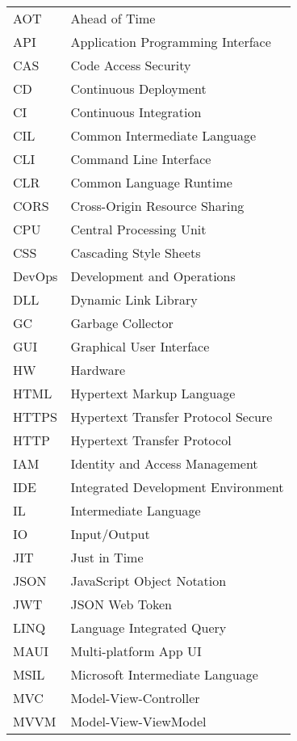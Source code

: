 
\seznamzkr

\begin{tabular}{ll}
AOT & Ahead of Time \\
API & Application Programming Interface \\
CAS & Code Access Security \\
CD & Continuous Deployment \\
CI & Continuous Integration \\
CIL & Common Intermediate Language \\
CLI & Command Line Interface \\
CLR & Common Language Runtime \\
CORS & Cross-Origin Resource Sharing \\
CPU & Central Processing Unit \\
CSS & Cascading Style Sheets \\
DevOps & Development and Operations \\
DLL & Dynamic Link Library \\
GC & Garbage Collector \\
GUI & Graphical User Interface \\
HW & Hardware \\
HTML & Hypertext Markup Language \\
HTTPS & Hypertext Transfer Protocol Secure \\
HTTP & Hypertext Transfer Protocol \\
IAM & Identity and Access Management \\
IDE & Integrated Development Environment \\
IL & Intermediate Language \\
IO & Input/Output \\
JIT & Just in Time \\
JSON & JavaScript Object Notation \\
JWT & JSON Web Token \\
LINQ & Language Integrated Query \\
MAUI & Multi-platform App UI \\
MSIL & Microsoft Intermediate Language \\
MVC & Model-View-Controller \\
MVVM & Model-View-ViewModel \\

\end{tabular}
